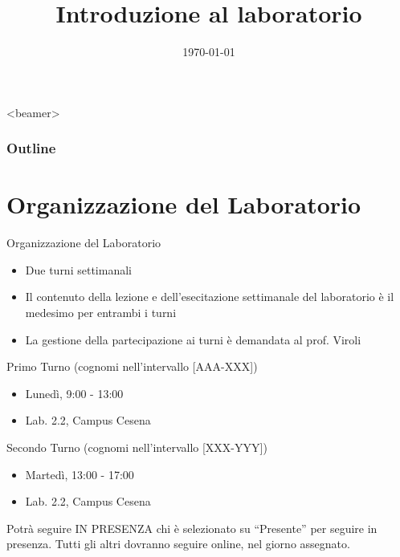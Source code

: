 \documentclass[xcolor=dvipsnames,presentation]{beamer}
\title[{\lab} -- Introduzione]{Introduzione al laboratorio}
\date[\today]{\today}
\begin{document}
\frame[label=coverpage]{\titlepage}

\begin{frame}<beamer>
	\frametitle{Outline}
	\tableofcontents[]
\end{frame}

\section{Organizzazione del Laboratorio}\label{sec:organizzazione-del-laboratorio}

\begin{frame}{Organizzazione del Laboratorio}
    \begin{itemize}
        \item Due turni settimanali
        \item Il contenuto della lezione e dell'esecitazione settimanale del laboratorio è il medesimo per entrambi i turni
        \item La gestione della partecipazione ai turni è demandata al prof. Viroli
    \end{itemize}
    \begin{block}{Primo Turno (cognomi nell'intervallo [AAA-XXX])}
        \begin{itemize}
            \item Lunedì, 9:00 - 13:00
            \item Lab. 2.2, Campus Cesena
        \end{itemize}
    \end{block}
    \begin{block}{Secondo Turno (cognomi nell'intervallo [XXX-YYY])}
        \begin{itemize}
            \item Martedì, 13:00 - 17:00
            \item Lab. 2.2, Campus Cesena
        \end{itemize}
    \end{block}
    Potrà seguire IN PRESENZA chi è selezionato su ``Presente'' per seguire in presenza. Tutti gli altri dovranno seguire online, nel giorno assegnato.
\end{frame}

\end{document}
